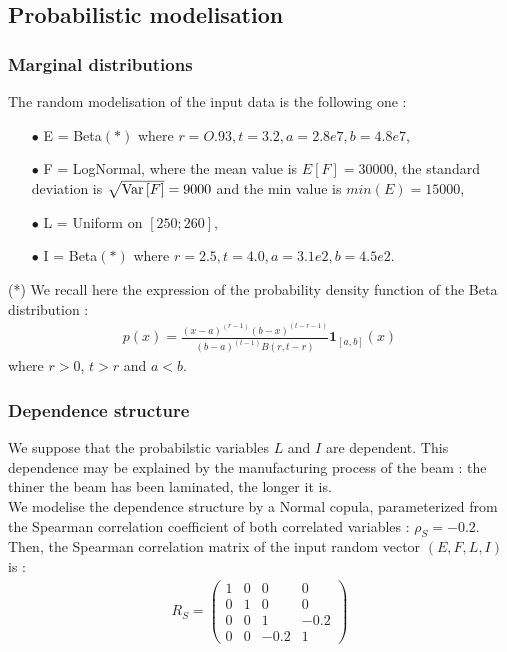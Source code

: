 \documentclass[11pt]{article}
\begin{document}
\subsection{Probabilistic modelisation}

\subsubsection{Marginal distributions}

The random modelisation of the input data is the following one :
\begin{itemize}
\item[$\bullet$] E = Beta$(*)$ where $r = O.93,t = 3.2,a = 2.8e7,b = 4.8e7$,
\item[$\bullet$] F  = LogNormal, where the mean value is $E[F] = 30000$, the standard deviation is $\sqrt{{\rm Var}\left[ F \right]} = 9000$ and the min value is $min(E) = 15000$,
\item[$\bullet$] L  = Uniform on $[250; 260]$,
\item[$\bullet$] I  = Beta$(*)$ where $r = 2.5,t = 4.0,a = 3.1e2,b = 4.5e2$.
\end{itemize}
(*) We recall here the expression of the probability density function of the Beta distribution :
\begin{align*}
  \displaystyle  p(x) = \frac{(x-a)^{(r-1)}(b-x)^{(t-r-1)}}{(b-a)^{(t-1)}B(r,t-r)}\boldsymbol{1}_{[a,b]}(x)
\end{align*}
where $r>0$, $t>r$ and $a < b$.



\subsubsection{Dependence structure}

We suppose that the probabilstic variables $L$ and $I$ are dependent. This dependence may be explained by the manufacturing process of the beam : the thiner the beam has been laminated, the longer it is.\\
We modelise the dependence structure by a Normal copula, parameterized from the Spearman correlation coefficient of both correlated variables : $\rho_S = -0.2$.\\
Then, the Spearman correlation matrix of the input random vector $(E,F,L,I)$ is :
\begin{align*}
  R_S = \left (
  \begin{array}{cccc}
    1 & 0 & 0 & 0 \\
    0 & 1 & 0 & 0 \\
    0 & 0 & 1 & -0.2 \\
    0 & 0 & -0.2 & 1
  \end{array}
  \right)
\end{align*}
\end{document}

